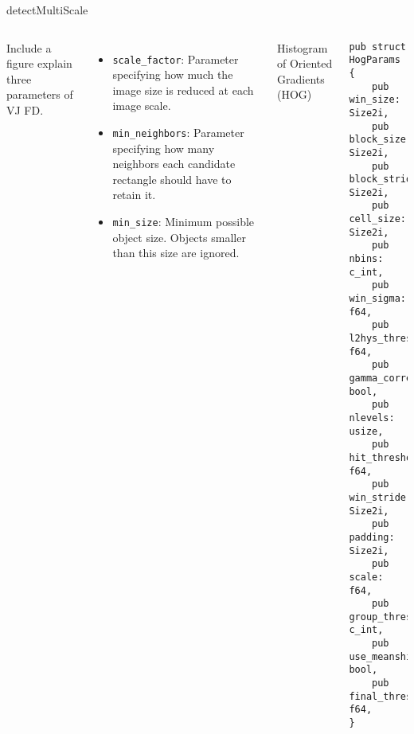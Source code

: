 \begin{frame}[fragile]{detectMultiScale}
  \footnotesize
  \begin{columns}
    Include a figure explain three parameters of VJ FD.
    
    \begin{itemize}
    \item \texttt{scale\_factor}: Parameter specifying how much the image size is
      reduced at each image scale.
    \item \texttt{min\_neighbors}: Parameter specifying
      how many neighbors each candidate rectangle should have to retain it.
    \item \texttt{min\_size}: Minimum possible object size. Objects smaller than
      this size are ignored.
    \end{itemize}

    Histogram of Oriented Gradients (HOG)

\begin{Verbatim}[fontsize=\scriptsize]
pub struct HogParams {
    pub win_size: Size2i,
    pub block_size: Size2i,
    pub block_stride: Size2i,
    pub cell_size: Size2i,
    pub nbins: c_int,
    pub win_sigma: f64,
    pub l2hys_threshold: f64,
    pub gamma_correction: bool,
    pub nlevels: usize,
    pub hit_threshold: f64,
    pub win_stride: Size2i,
    pub padding: Size2i,
    pub scale: f64,
    pub group_threshold: c_int,
    pub use_meanshift_grouping: bool,
    pub final_threshold: f64,
}
\end{Verbatim}

  \end{columns}
\end{frame}

